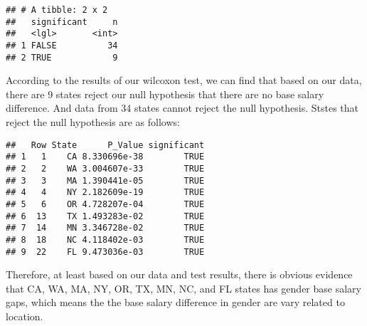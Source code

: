 \documentclass[
]{article}
\newenvironment{Shaded}{\begin{snugshade}}{\end{snugshade}}
\newcommand{\AttributeTok}[1]{\textcolor[rgb]{0.77,0.63,0.00}{#1}}
\newcommand{\FunctionTok}[1]{\textcolor[rgb]{0.00,0.00,0.00}{#1}}
\newcommand{\NormalTok}[1]{#1}
\newcommand{\OtherTok}[1]{\textcolor[rgb]{0.56,0.35,0.01}{#1}}
\newcommand{\SpecialCharTok}[1]{\textcolor[rgb]{0.00,0.00,0.00}{#1}}
\begin{document}
\begin{verbatim}
## # A tibble: 2 x 2
##   significant     n
##   <lgl>       <int>
## 1 FALSE          34
## 2 TRUE            9
\end{verbatim}

According to the results of our wilcoxon test, we can find that based on
our data, there are 9 states reject our null hypothesis that there are
no base salary difference. And data from 34 states cannot reject the
null hypothesis. Ststes that reject the null hypothesis are as follows:

\begin{verbatim}
##   Row State      P_Value significant
## 1   1    CA 8.330696e-38        TRUE
## 2   2    WA 3.004607e-33        TRUE
## 3   3    MA 1.390441e-05        TRUE
## 4   4    NY 2.182609e-19        TRUE
## 5   6    OR 4.728207e-04        TRUE
## 6  13    TX 1.493283e-02        TRUE
## 7  14    MN 3.346728e-02        TRUE
## 8  18    NC 4.118402e-03        TRUE
## 9  22    FL 9.473036e-03        TRUE
\end{verbatim}

Therefore, at least based on our data and test results, there is obvious
evidence that CA, WA, MA, NY, OR, TX, MN, NC, and FL states has gender
base salary gaps, which means the the base salary difference in gender
are vary related to location.

\begin{Shaded}
\end{Shaded}
\end{document}
